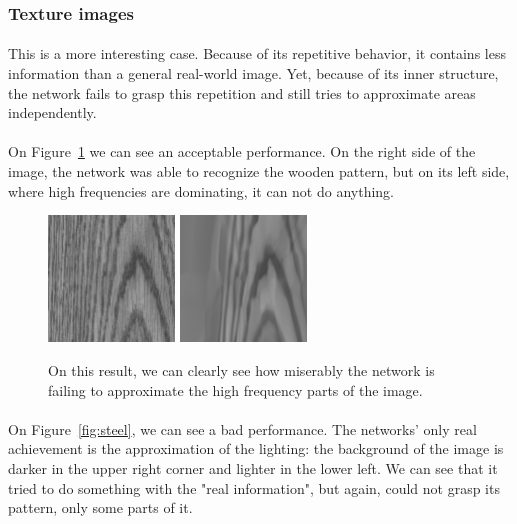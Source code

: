 \documentclass[a4paper]{article}
\begin{document}
\subsubsection{Texture images}

\paragraph{}This is a more interesting case. Because of its repetitive behavior, it contains less information than a general real-world image. Yet, because of its inner structure, the network fails to grasp this repetition and still tries to approximate areas independently. 

\paragraph{}On Figure~\ref{fig:wood} we can see an acceptable performance. On the right side of the image, the network was able to recognize the wooden pattern, but on its left side, where high frequencies are dominating, it can not do anything.

\begin{figure}[h]
\centering
\includegraphics[width=0.3\textwidth]{images/wood.jpg}
\includegraphics[width=0.3\textwidth]{images_old/woodo.png}
\caption{\label{fig:wood}On this result, we can clearly see how miserably the network is failing to approximate the high frequency parts of the image.}
\end{figure}

\paragraph{}On Figure~\ref{fig:steel}, we can see a bad performance. The networks' only real achievement is the approximation of the lighting: the background of the image is darker in the upper right corner and lighter in the lower left. We can see that it tried to do something with the "real information", but again, could not grasp its pattern, only some parts of it. 
\end{document}
